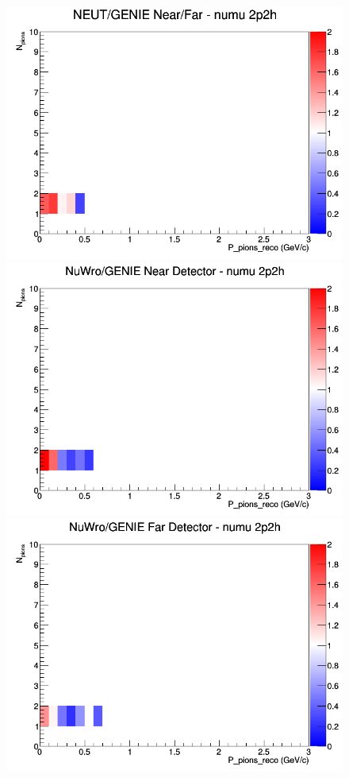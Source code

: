 \documentclass[12pt]{article}
\begin{document}
\begin{figure}[h]
\endminipage
{}
\includegraphics[width=\linewidth]{eff_N_P/FGT/pions/ratios/2p2h_NEUT_GENIE_numu_NF_N_P.png}
\endminipage
\newline
{}
\includegraphics[width=\linewidth]{eff_N_P/FGT/pions/ratios/2p2h_NuWro_GENIE_numu_near_N_P.png}
\endminipage
{}
\includegraphics[width=\linewidth]{eff_N_P/FGT/pions/ratios/2p2h_NuWro_GENIE_numu_far_N_P.png}

\end{figure}
\end{document}
